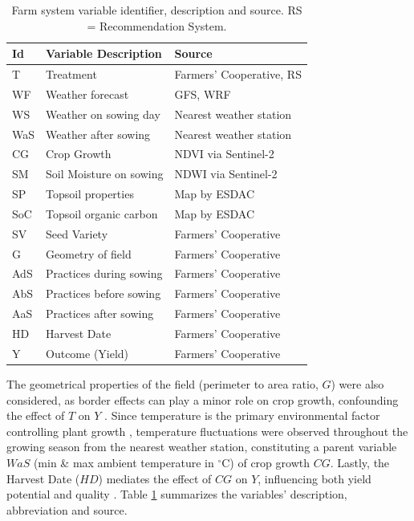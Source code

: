 \documentclass[letterpaper]{article} %
\begin{document}
\begin{table}[!ht]
\small
\centering
\begin{tabular}{lll}
\toprule
\textbf{Id} & \textbf{Variable Description}           & \textbf{Source}         \\ \midrule
T   & Treatment & Farmers' Cooperative, RS    
\\
WF  & Weather forecast             & GFS, WRF                \\
WS  & Weather on sowing day        & Nearest weather station \\
WaS & Weather after sowing         & Nearest weather station                  \\
CG  & Crop Growth                  & NDVI via Sentinel-2                      \\
SM  & Soil Moisture on sowing      & NDWI via Sentinel-2     \\
SP  & Topsoil properties           & Map by ESDAC \\
SoC & Topsoil organic carbon       & Map by ESDAC \\
SV  & Seed Variety                 & Farmers' Cooperative \\
G   & Geometry of field           & Farmers' Cooperative                  \\
AdS & Practices during sowing      & Farmers' Cooperative \\
AbS & Practices before sowing      & Farmers' Cooperative \\
AaS & Practices after sowing       & Farmers' Cooperative \\
HD  & Harvest Date                 & Farmers' Cooperative \\
Y   & Outcome (Yield)              & Farmers' Cooperative \\ \bottomrule
\end{tabular}%
\caption{Farm system variable identifier, description and source. RS = Recommendation System.}
\label{tab:variables}
\end{table}

The geometrical properties of the field (perimeter to area ratio, $G$) were also considered, as border effects can play a minor role on crop growth, confounding the effect of $T$ on $Y$
\cite{green1956border}. Since temperature is the primary environmental factor controlling plant growth \cite{bange2004impact,hatfield2015temperature}, temperature fluctuations were observed throughout the growing season from the nearest weather station, constituting a parent variable $WaS$ (min \& max ambient temperature in $^\circ$C) of crop growth $CG$. 
Lastly, the Harvest Date ($HD$) mediates the effect of $CG$ on $Y$, influencing both yield potential and quality \cite{dong2006yield,bange2008managing}. Table \ref{tab:variables} summarizes the variables' description, abbreviation and source.  
\end{document}
